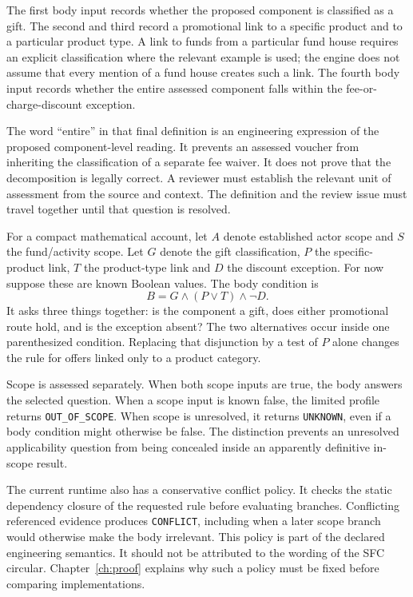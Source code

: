 The first body input records whether the proposed component is classified as a
gift. The second and third record a promotional link to a specific product and
to a particular product type. A link to funds from a particular fund house
requires an explicit classification where the relevant example is used; the
engine does not assume that every mention of a fund house creates such a link.
The fourth body input records whether the entire assessed component falls
within the fee-or-charge-discount exception.

The word ``entire'' in that final definition is an engineering expression of
the proposed component-level reading. It prevents an assessed voucher from
inheriting the classification of a separate fee waiver. It does not prove that
the decomposition is legally correct. A reviewer must establish the relevant
unit of assessment from the source and context. The definition and the review
issue must travel together until that question is resolved.


For a compact mathematical account, let $A$ denote established actor scope and
$S$ the fund/activity scope. Let $G$ denote the gift classification, $P$ the
specific-product link, $T$ the product-type link and $D$ the discount exception.
For now suppose these are known Boolean values. The body condition is
\begin{equation}
 B=G\land(P\lor T)\land\neg D.
 \label{eq:gift-body}
\end{equation}
It asks three things together: is the component a gift, does either promotional
route hold, and is the exception absent? The two alternatives occur inside one
parenthesized condition. Replacing that disjunction by a test of $P$ alone
changes the rule for offers linked only to a product category.

Scope is assessed separately. When both scope inputs are true, the body answers
the selected question. When a scope input is known false, the limited profile
returns \texttt{OUT\_OF\_SCOPE}. When scope is unresolved, it returns
\texttt{UNKNOWN}, even if a body condition might otherwise be false. The
distinction prevents an unresolved applicability question from being concealed
inside an apparently definitive in-scope result.

The current runtime also has a conservative conflict policy. It checks the
static dependency closure of the requested rule before evaluating branches.
Conflicting referenced evidence produces \texttt{CONFLICT}, including when a
later scope branch would otherwise make the body irrelevant. This policy is
part of the declared engineering semantics. It should not be attributed to the
wording of the SFC circular. Chapter~\ref{ch:proof} explains why such a policy
must be fixed before comparing implementations.

